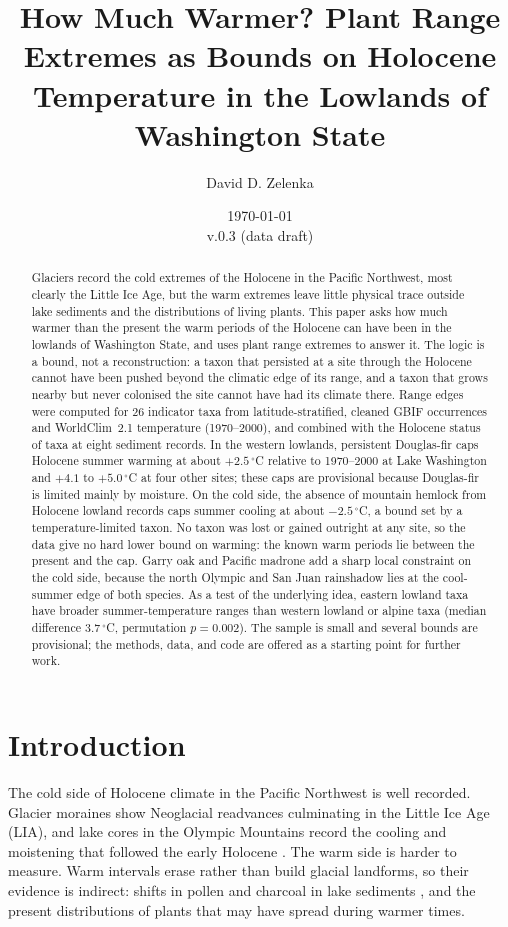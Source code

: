 \documentclass[11pt]{article}
\title{\textbf{How Much Warmer? Plant Range Extremes as Bounds on Holocene Temperature in the Lowlands of Washington State}}
\author{David D. Zelenka}
\date{\today\\v.0.3 (data draft)}
\newcommand{\degC}{\ensuremath{^{\circ}}C}
\begin{document}
\maketitle

\begin{abstract}
Glaciers record the cold extremes of the Holocene in the Pacific Northwest, most clearly the Little Ice Age, but the warm extremes leave little physical trace outside lake sediments and the distributions of living plants. This paper asks how much warmer than the present the warm periods of the Holocene can have been in the lowlands of Washington State, and uses plant range extremes to answer it. The logic is a bound, not a reconstruction: a taxon that persisted at a site through the Holocene cannot have been pushed beyond the climatic edge of its range, and a taxon that grows nearby but never colonised the site cannot have had its climate there. Range edges were computed for 26 indicator taxa from latitude-stratified, cleaned GBIF occurrences and WorldClim~2.1 temperature (1970--2000), and combined with the Holocene status of taxa at eight sediment records. In the western lowlands, persistent Douglas-fir caps Holocene summer warming at about $+2.5$\,\degC{} relative to 1970--2000 at Lake Washington and $+4.1$ to $+5.0$\,\degC{} at four other sites; these caps are provisional because Douglas-fir is limited mainly by moisture. On the cold side, the absence of mountain hemlock from Holocene lowland records caps summer cooling at about $-2.5$\,\degC{}, a bound set by a temperature-limited taxon. No taxon was lost or gained outright at any site, so the data give no hard lower bound on warming: the known warm periods lie between the present and the cap. Garry oak and Pacific madrone add a sharp local constraint on the cold side, because the north Olympic and San Juan rainshadow lies at the cool-summer edge of both species. As a test of the underlying idea, eastern lowland taxa have broader summer-temperature ranges than western lowland or alpine taxa (median difference 3.7\,\degC, permutation $p=0.002$). The sample is small and several bounds are provisional; the methods, data, and code are offered as a starting point for further work.
\end{abstract}

\section{Introduction}\label{sec:intro}

The cold side of Holocene climate in the Pacific Northwest is well recorded. Glacier moraines show Neoglacial readvances culminating in the Little Ice Age (LIA), and lake cores in the Olympic Mountains record the cooling and moistening that followed the early Holocene \citep{menounos2009,gavin2001,zelenka2026olympic}. The warm side is harder to measure. Warm intervals erase rather than build glacial landforms, so their evidence is indirect: shifts in pollen and charcoal in lake sediments \citep{whitlock1992,walsh2008battleground,leopold2016orcas}, and the present distributions of plants that may have spread during warmer times.
\end{document}
